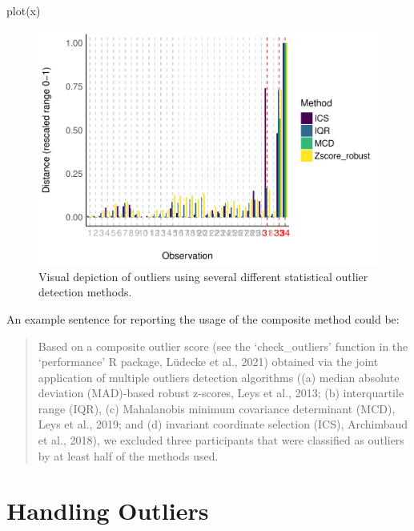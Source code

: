 \documentclass[
]{article}
\newenvironment{Shaded}{\begin{snugshade}}{\end{snugshade}}
\newcommand{\FunctionTok}[1]{\textcolor[rgb]{0.00,0.00,0.00}{#1}}
\newcommand{\NormalTok}[1]{#1}
\begin{document}
\begin{Shaded}
\begin{Highlighting}[]
\FunctionTok{plot}\NormalTok{(x)}
\end{Highlighting}
\end{Shaded}

\begin{figure}
\includegraphics[width=1\linewidth]{paper_files/figure-latex/multimethod-1} \caption{Visual depiction of outliers using several different statistical outlier detection methods.}\label{fig:multimethod}
\end{figure}

An example sentence for reporting the usage of the composite method could be:

\begin{quote}
Based on a composite outlier score (see the `check\_outliers' function in the `performance' R package, Lüdecke et al., 2021) obtained via the joint application of multiple outliers detection algorithms ((a) median absolute deviation (MAD)-based robust z-scores, Leys et al., 2013; (b) interquartile range (IQR), (c) Mahalanobis minimum covariance determinant (MCD), Leys et al., 2019; and (d) invariant coordinate selection (ICS), Archimbaud et al., 2018), we excluded three participants that were classified as outliers by at least half of the methods used.
\end{quote}

\hypertarget{handling-outliers}{%
\section{Handling Outliers}\label{handling-outliers}}
\end{document}
